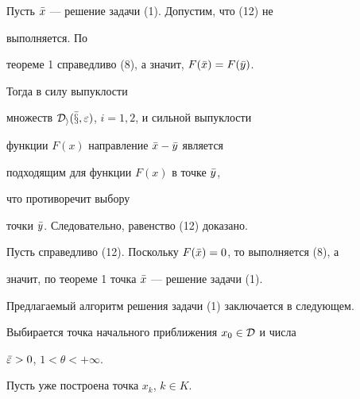 \begin{pf}


Пусть $\Bar x$ --- решение задачи (1). Допустим, что (12) не


выполняется. По


теореме 1 справедливо (8), а значит, $F(\Bar x)=F(\Bar y)$.


Тогда в силу выпуклости


множеств $\cal D_i(\Bar x,\varepsilon)$, $i=1,2$, и сильной выпуклости


функции $F(x)$ направление $\Bar x-\Bar y$ является


подходящим для функции $F(x)$ в точке $\Bar y$,


что противоречит выбору


точки $\Bar y$. Следовательно, равенство (12) доказано.





Пусть справедливо (12). Поскольку $F(\Bar x)=0$, то выполняется (8), а


значит, по теореме 1 точка $\Bar x$ --- решение задачи (1).


\end{pf}





Предлагаемый алгоритм решения задачи (1) заключается в следующем.


Выбирается точка начального приближения $x_0\in\cal D$ и числа


$\Bar\varepsilon>0$, $1<\theta<+\infty$.


Пусть уже построена точка $x_k$, $k\in K$.


